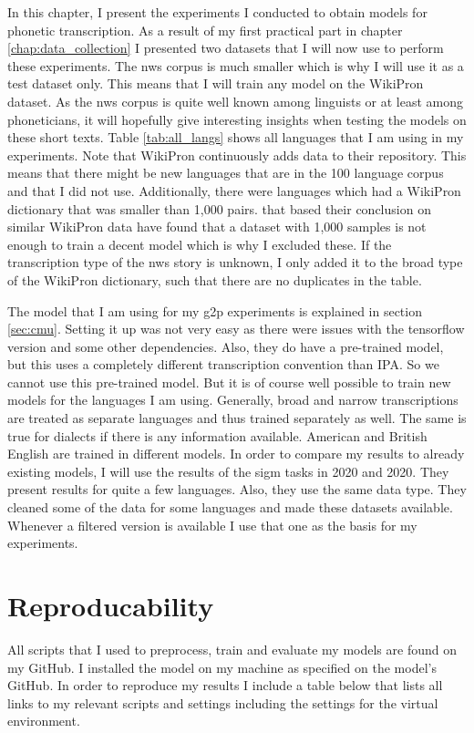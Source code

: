 
\label{chap:exp}
In this chapter, I present the experiments I conducted to obtain models for phonetic transcription. As a result of my first practical part in chapter \ref{chap:data_collection} I presented two datasets that I will now use to perform these experiments. The \ac{nws} corpus is much smaller which is why I will use it as a test dataset only. This means that I will train any model on the WikiPron dataset. As the \ac{nws} corpus is quite well known among linguists or at least among phoneticians, it will hopefully give interesting insights when testing the models on these short texts. Table \ref{tab:all_langs} shows all languages that I am using in my experiments. Note that WikiPron continuously adds data to their repository. This means that there might be new languages that are in the 100 language corpus and that I did not use. Additionally, there were languages which had a WikiPron dictionary that was smaller than 1,000 pairs. \citet{Ashby-Bartley.2021} that based their conclusion on similar WikiPron data have found that a dataset with 1,000 samples is not enough to train a decent model which is why I excluded these. If the transcription type of the \ac{nws} story is unknown, I only added it to the broad type of the WikiPron dictionary, such that there are no duplicates in the table. 

The model that I am using for my \ac{g2p} experiments is explained in section \ref{sec:cmu}. Setting it up was not very easy as there were issues with the tensorflow version and some other dependencies. Also, they do have a pre-trained model, but this uses a completely different transcription convention than IPA. So we cannot use this pre-trained model. But it is of course well possible to train  new models for the languages I am using. Generally, broad and narrow transcriptions are treated as separate languages and thus trained separately as well. The same is true for dialects if there is any information available. American and British English are trained in different models. In order to compare my results to already existing models, I will use the results of the \ac{sigm} tasks in 2020 and 2020. They present results for quite a few languages. Also, they use the same data type. They cleaned some of the data for some languages and made these datasets available. Whenever a filtered version is available I use that one as the basis for my experiments. 

\section{Reproducability}
All scripts that I used to preprocess, train and evaluate my models are found on my GitHub. I installed the model on my machine as specified on the model's GitHub. In order to reproduce my results I include a table below that lists all links to my relevant scripts and settings including the settings for the virtual environment. 

